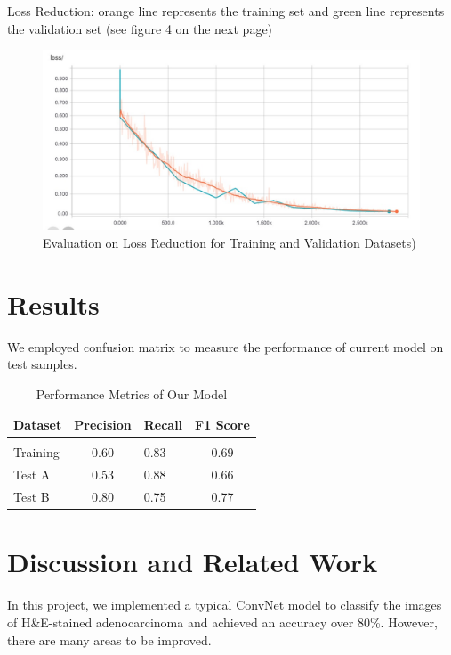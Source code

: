 \documentclass[twoside,11pt]{article}
\begin{document}
Loss Reduction: orange line represents the training set and green line represents the validation set
(see figure 4 on the next page)

\begin{figure}[htbp]
\centering
\includegraphics[width=.8\textwidth]{figure6.jpg}
\caption{Evaluation on Loss Reduction for Training and Validation Datasets)}
\label{figure1}
\end{figure}


\newpage
\section{Results} \label{results}
We employed confusion matrix to measure the performance of current model on test samples.

\begin{table}[htbp]
  \centering 
  \begin{tabular}{lclc} 
    Dataset & Precision & Recall & F1 Score\\ 
    \hline \\[-11pt]
    Training & 0.60 & 0.83 &0.69 \\ 
    Test A    & 0.53 & 0.88 & 0.66\\
    Test B    & 0.80 & 0.75 & 0.77 \\ \hline
  \end{tabular}
  \label{tab:example} 
    \caption{Performance Metrics of Our Model} 
\end{table}

\section{Discussion and Related Work} 
In this project, we implemented a typical ConvNet model to classify the images of H&E-stained adenocarcinoma and achieved an accuracy over 80\%. However, there are many areas to be improved. 
\end{document}
